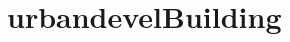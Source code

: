 \documentclass{scrartcl}
\begin{document}
\section{urbandevelBuilding}\hypertarget{urbandevelbuilding}{}\label{urbandevelbuilding}
\end{document}
